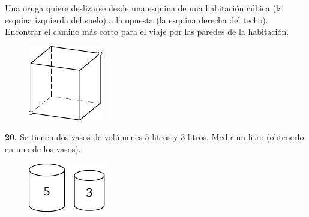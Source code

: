 \documentclass[12pt]{article}  %
\begin{document}
 Una oruga quiere deslizarse desde una esquina de una habitaci\'on c\'ubica (la esquina izquierda del suelo) a la opuesta (la esquina derecha del techo).
Encontrar el camino m\'as corto para el viaje por las paredes de la habitaci\'on.
\begin{figure}[h]
\centering
\footnotesize
\includegraphics[scale=1]{taskbook-3}
\end{figure}
\newline\newline\quad
{\bf 20.} Se tienen dos vasos de vol\'umenes 5 litros y 3 litros. Medir un litro (obtenerlo en uno de los vasos).

\begin{figure}[h!]
\centering
\footnotesize
\includegraphics[scale=1]{taskbook-4}
\end{figure}
\end{document}
